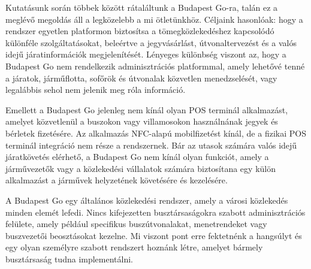 Kutatásunk során többek között rátaláltunk a Budapest Go-ra, talán ez a
meglévő megoldás áll a legközelebb a mi ötletünkhöz. Céljaink hasonlóak: hogy
a rendszer egyetlen platformon biztosítsa a tömegközlekedéshez kapcsolódó
különféle szolgáltatásokat, beleértve a jegyvásárlást, útvonaltervezést és a valós
idejű járatinformációk megjelenítését. Lényeges különbség viszont az, hogy a
Budapest Go nem rendelkezik adminisztrációs platformmal, amely lehetővé
tenné a járatok, járműflotta, sofőrök és útvonalak közvetlen menedzselését,
vagy legalábbis sehol nem jelenik meg róla információ.

Emellett a Budapest Go jelenleg nem kínál olyan POS terminál alkalmazást,
amelyet közvetlenül a buszokon vagy villamosokon használnának jegyek és
bérletek fizetésére. Az alkalmazás NFC-alapú mobilfizetést kínál, de a fizikai POS
terminál integráció nem része a rendszernek. Bár az utasok számára valós idejű
járatkövetés elérhető, a Budapest Go nem kínál olyan funkciót, amely a
járművezetők vagy a közlekedési vállalatok számára biztosítana egy külön
alkalmazást a járművek helyzetének követésére és kezelésére.

A Budapest Go egy általános közlekedési rendszer, amely a városi közlekedés
minden elemét lefedi. Nincs kifejezetten busztársaságokra szabott adminisztrációs felülete, amely például specifikus buszútvonalakat, menetrendeket vagy buszvezetői beosztásokat kezelne. Mi viszont pont erre fektetnénk a hangsúlyt és egy olyan személyre szabott rendszert hoznánk létre, amelyet bármely busztársaság tudna implementálni.